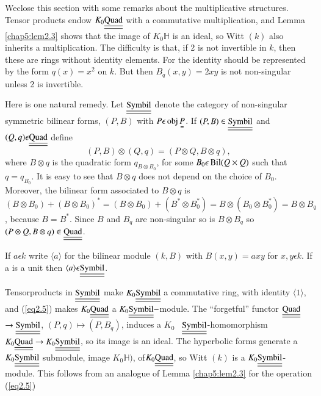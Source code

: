 We\pageoriginale close this section with some remarks about the
multiplicative structures. Tensor products endow $K_0
\underline{\underline{\rm Quad}}$ with a  
commutative multiplication, and Lemma \ref{chap5:lem2.3} shows that
the image of $K_0 
\mathbb{H}$ is an ideal, so Witt $(k)$ also inherits a
multiplication. The difficulty is that, if 2 is not invertible in $k$,
then these are rings without identity elements. For the identity
should be represented by the form $q(x) = x^2$ on $k$. But then
$B_q(x, y) = 2xy$ is not non-singular unless 2 is invertible. 

Here is one natural remedy. Let $\underline{\underline{\rm Symbil}}$
denote the category of non-singular symmetric bilinear forms, $(P, B)$
with $P \epsilon \operatorname{obj} \underset{=}P$. If $(P, B) \in
\underline{\underline{\rm Symbil}}$ and 
$(Q, q) \epsilon \underline{\underline{\rm Quad}}$ define 
\begin{equation*}
(P, B) \otimes (Q, q) = (P \otimes Q, B \otimes q), \tag{2.5}\label{eq2.5}
\end{equation*}
where $B \otimes q$ is the quadratic form $q_{B \otimes B_0}$, for
some $B_0 \epsilon \operatorname{Bil} (Q \times Q)$ such that $q = q_{B_0}$. It is
easy to see that $B \otimes q$ does not depend on the choice of
$B_0$. Moreover, the bilinear form associated to $B \otimes q$ is $(B
\otimes B_0) + (B \otimes B_0)^\ast = (B \otimes B_0) + (B^\ast \otimes
B^\ast_0) = B \otimes (B_0 \otimes B^\ast_0)= B \otimes B_q$, because $B =
B^\ast$. Since $B$ and $B_q$ are non-singular so is $B \otimes B_q$ so
$(P \otimes Q, B \otimes q) \in \underline{\underline{\rm Quad}}$. 

If $a \epsilon k$ write $\langle a \rangle$ for the bilinear module
$(k, B)$ with $B(x, y) = axy$ for $x, y \epsilon k$. If a is a unit
then $\langle a  \rangle \epsilon \underline{\underline{\rm Symbil}}$. 

Tensor\pageoriginale products in $\underline{\underline{\rm Symbil}}$
make $K_0 \underline{\underline{\rm Symbil}}$ a commutative ring, with
identity $\langle 1 \rangle$, and (\ref{eq2.5}) 
makes $K_0 \underline{\underline{\rm Quad}}$ a $K_0
\underline{\underline{\rm Symbil}}-$module. The
``forgetful'' functor $\underline{\underline{\rm Quad}}$ $\to
\underline{\underline{\rm Symbil}}$, $(P, 
q) \longmapsto (P, B_q)$, induces a $K_0$ \,
$\underline{\underline{\rm Symbil}}$-homomorphism $K_0
\underline{\underline{\rm Quad}}\to K_0 
\underline{\underline{\rm Symbil}}$, so its image is an ideal. The\break
hyperbolic forms generate a $K_0 \underline{\underline{\rm Symbil}}$
submodule, image $K_0 \mathbb{H})$, of\break $K_0 \underline{\underline{\rm
    Quad}}$, so Witt $(k)$ is a $K_0   
\underline{\underline{\rm Symbil}}$-module. This follows from an
analogue of Lemma \ref{chap5:lem2.3} for the operation (\ref{eq2.5}) 

